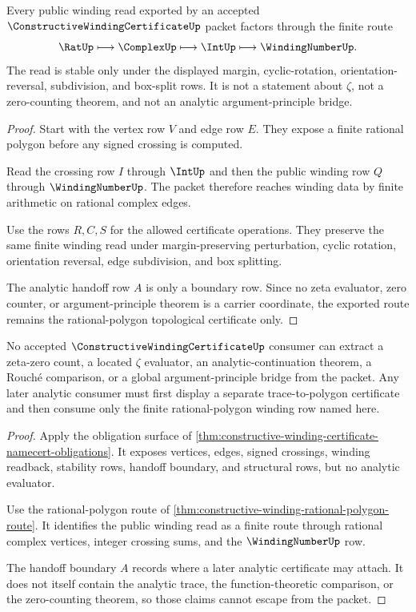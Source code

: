 \begin{theorem}
\label{thm:constructive-winding-rational-polygon-route}
Every public winding read exported by an accepted $\ConstructiveWindingCertificateUp$ packet factors through the finite route
$$
\RatUp \longmapsto \ComplexUp \longmapsto \IntUp \longmapsto \WindingNumberUp .
$$
The read is stable only under the displayed margin, cyclic-rotation, orientation-reversal, subdivision, and box-split rows. It is not a statement about $\zeta$, not a zero-counting theorem, and not an analytic argument-principle bridge.
\end{theorem}
\begin{proof}
Start with the vertex row $V$ and edge row $E$. They expose a finite rational polygon before any signed crossing is computed.

Read the crossing row $I$ through $\IntUp$ and then the public winding row $Q$ through $\WindingNumberUp$. The packet therefore reaches winding data by finite arithmetic on rational complex edges.

Use the rows $R,C,S$ for the allowed certificate operations. They preserve the same finite winding read under margin-preserving perturbation, cyclic rotation, orientation reversal, edge subdivision, and box splitting.

The analytic handoff row $A$ is only a boundary row. Since no zeta evaluator, zero counter, or argument-principle theorem is a carrier coordinate, the exported route remains the rational-polygon topological certificate only.
\end{proof}

\begin{theorem}
\label{thm:constructive-winding-certificate-nonescape}
No accepted $\ConstructiveWindingCertificateUp$ consumer can extract a zeta-zero count, a located $\zeta$ evaluator, an analytic-continuation theorem, a Rouch\'e comparison, or a global argument-principle bridge from the packet. Any later analytic consumer must first display a separate trace-to-polygon certificate and then consume only the finite rational-polygon winding row named here.
\end{theorem}
\begin{proof}
Apply the obligation surface of \autoref{thm:constructive-winding-certificate-namecert-obligations}. It exposes vertices, edges, signed crossings, winding readback, stability rows, handoff boundary, and structural rows, but no analytic evaluator.

Use the rational-polygon route of \autoref{thm:constructive-winding-rational-polygon-route}. It identifies the public winding read as a finite route through rational complex vertices, integer crossing sums, and the $\WindingNumberUp$ row.

The handoff boundary $A$ records where a later analytic certificate may attach. It does not itself contain the analytic trace, the function-theoretic comparison, or the zero-counting theorem, so those claims cannot escape from the packet.
\end{proof}

